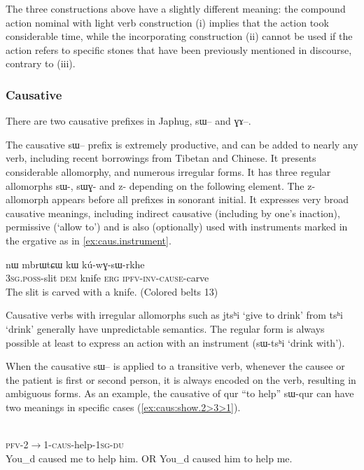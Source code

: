 \documentclass[oldfontcommands,oneside,a4paper,11pt]{article}
\newcommand{\ipa}[1]{{\phon#1}} %
\begin{document}
The three constructions above have a slightly different meaning: the compound action nominal with light verb construction (i) implies that the action took considerable time, while the incorporating construction (ii) cannot be used if the action refers to specific stones that have been previously mentioned in discourse, contrary  to (iii).

\subsubsection{Causative}
There are two causative prefixes in Japhug, \ipa{sɯ--} and \ipa{ɣɤ--}. 

The causative   \ipa{sɯ--} prefix is extremely productive, and can be added to nearly any verb, including recent borrowings from Tibetan and Chinese. It presents  considerable allomorphy, and numerous irregular forms. It has three regular allomorphs \ipa{sɯ-}, \ipa{sɯɣ-} and \ipa{z-} depending on the following element. The \ipa{z-} allomorph appears before all prefixes in sonorant initial. It expresses very broad causative meanings, including indirect causative (including by one's inaction), permissive (`allow to') and is also (optionally) used with  instruments marked in the ergative as in \ref{ex:caus.instrument}.


\begin{exe}
\ex \label{ex:caus.instrument}
\gll  \ipa{ɯ-χto} 	\ipa{nɯ} 	\ipa{mbrɯtɕɯ} 	\ipa{kɯ} 	\ipa{kú-wɣ-sɯ-rkhe}  \\
\textsc{3sg.poss}-slit \textsc{dem} knife \textsc{erg}  \textsc{ipfv-inv-cause}-carve \\
 \glt  The slit is carved with a knife. (Colored belts 13)
\end{exe} 

Causative verbs with irregular allomorphs such as \ipa{jtsʰi} `give to drink'  from \ipa{tsʰi} `drink' generally have unpredictable semantics. The regular form is always possible at least to express an action with an instrument (\ipa{sɯ-tsʰi} `drink with').

When the causative \ipa{sɯ--} is applied to a transitive verb, whenever the causee or the patient is first or second person, it is always encoded on the verb, resulting in ambiguous forms. As an example, the causative of \ipa{qur} ``to help''  \ipa{sɯ-qur} can have two meanings in specific cases (\ref{ex:caus:show.2>3>1}).

\begin{exe} 
\ex \label{ex:caus:show.2>3>1}
\gll   \ipa{tɤ-kɯ-sɯ-qur-a-ndʑi}  \\
 \textsc{pfv-2$\rightarrow$1-caus}-help-\textsc{1sg-du}  \\
 \glt  You_d caused me to help him. OR You_d caused him to help me. 
\end{exe} 
\end{document}
